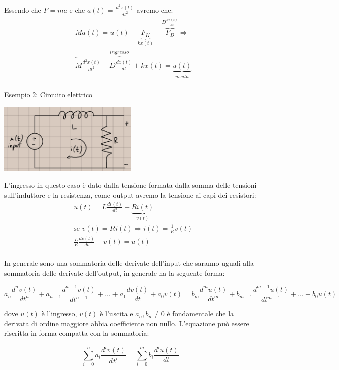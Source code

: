 \documentclass[a4paper, 12pt]{book}
\theoremstyle{plain}
\begin{document}
Essendo che $F = ma$ e che $a(t) = \frac{d^2x(t)}{dt^2}$ avremo che:
\[
    \begin{split}
        &Ma(t) = u(t) - \underbrace{F_K}_{kx(t)} - \overbrace{F_D}^{D\frac{dx(t)}{dt}} \Rightarrow \\
        &\overbrace{M \frac{d^2x(t)}{dt^2} + D \frac{dx(t)}{dt} + kx(t)}^{ingresso} = \underbrace{u(t)}_{uscita} \\
    \end{split}
\]

Esempio 2: Circuito elettrico

\begin{center}
    \includegraphics[width=0.5\textwidth]{circuito.jpg}
\end{center}

L'ingresso in questo caso è dato dalla tensione formata dalla somma delle tensioni sull'induttore e la resistenza, come output
avremo la tensione ai capi dei resistori:
\[
    \begin{split}
        &u(t) = L \frac{di(t)}{dt} + \underbrace{Ri(t)}_{v(t)} \\
        &\textrm{se } v(t) = Ri(t) \Rightarrow i(t) = \frac{1}{R} v(t) \\
        &\frac{L}{R} \frac{dv(t)}{dt} + v(t) = u(t) \\
    \end{split}
\]

In generale sono una sommatoria delle derivate dell'input che saranno uguali alla sommatoria delle derivate 
dell'output, in generale ha la seguente forma:

\[
    a_n \frac{d^nv(t)}{dt^n} + a_{n - 1} \frac{d^{n - 1}v(t)}{dt^{n - 1}} + \dots + a_1 \frac{dv(t)}{dt} + a_0 v(t) = b_m \frac{d^mu(t)}{dt^m} + b_{m - 1} \frac{d^{m - 1} u(t)}{dt^{m - 1}} + \dots + b_0u(t)
\]

dove $u(t)$ è l'ingresso, $v(t)$ è l'uscita e $a_n, b_n \neq 0$ è fondamentale che la derivata di ordine maggiore abbia 
coefficiente non nullo. L'equazione può essere riscritta in forma compatta con la sommatoria:

\[
    \sum_{i = 0}^n a_i \frac{d^iv(t)}{dt^i} = \sum_{i = 0}^m b_i \frac{d^iu(t)}{dt}
\]
\end{document}
